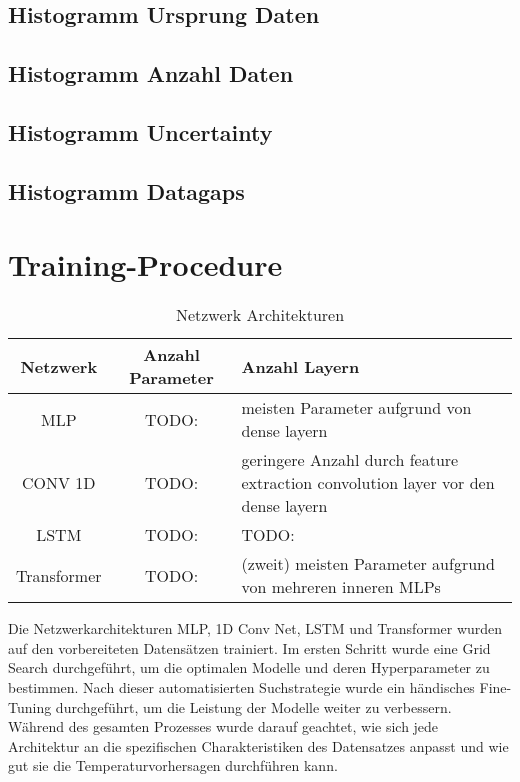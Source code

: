 \documentclass[manuscript,screen,review]{acmart}
\begin{document}
\subsection{Histogramm Ursprung Daten}

\subsection{Histogramm Anzahl Daten}

\subsection{Histogramm Uncertainty}

\subsection{Histogramm Datagaps}


\section{Training-Procedure}

\begin{table}
  \caption{Netzwerk Architekturen}
  \label{tab:freq}
  \begin{tabular}{ccl}
    \toprule
    Netzwerk&Anzahl Parameter&Anzahl Layern\\
    \midrule
    MLP & TODO: & meisten Parameter aufgrund von dense layern\\
    CONV 1D & TODO: & geringere Anzahl durch feature extraction convolution layer vor den dense layern\\
    LSTM & TODO: & TODO:\\
    Transformer & TODO: & (zweit) meisten Parameter aufgrund von mehreren inneren MLPs\\
  \bottomrule
\end{tabular}
\end{table}


Die Netzwerkarchitekturen MLP, 1D Conv Net, LSTM und Transformer wurden auf den vorbereiteten Datensätzen trainiert. 
Im ersten Schritt wurde eine Grid Search durchgeführt, um die optimalen Modelle und deren Hyperparameter zu bestimmen. 
Nach dieser automatisierten Suchstrategie wurde ein händisches Fine-Tuning durchgeführt, um die Leistung der Modelle weiter zu verbessern. 
Während des gesamten Prozesses wurde darauf geachtet, wie sich jede Architektur an die spezifischen Charakteristiken des Datensatzes anpasst und 
wie gut sie die Temperaturvorhersagen durchführen kann.
\end{document}
